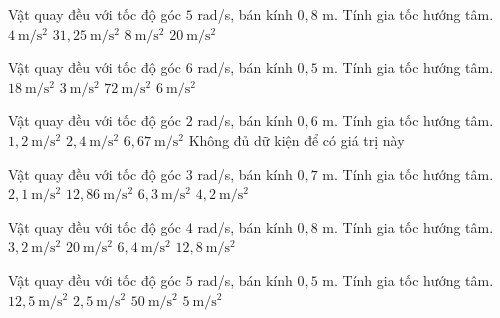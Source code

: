 \begin{ex}
Vật quay đều với tốc độ góc $5$ rad/s, bán kính $0,8$ m. Tính gia tốc hướng tâm.
\choice
{$4\ \mathrm{m/s^2}$}
{$31,25\ \mathrm{m/s^2}$}
{$8\ \mathrm{m/s^2}$}
{\True $20\ \mathrm{m/s^2}$}
\end{ex}

\begin{ex}
Vật quay đều với tốc độ góc $6$ rad/s, bán kính $0,5$ m. Tính gia tốc hướng tâm.
\choice
{\True $18\ \mathrm{m/s^2}$}
{$3\ \mathrm{m/s^2}$}
{$72\ \mathrm{m/s^2}$}
{$6\ \mathrm{m/s^2}$}
\end{ex}

\begin{ex}
Vật quay đều với tốc độ góc $2$ rad/s, bán kính $0,6$ m. Tính gia tốc hướng tâm.
\choice
{$1,2\ \mathrm{m/s^2}$}
{\True $2,4\ \mathrm{m/s^2}$}
{$6,67\ \mathrm{m/s^2}$}
{Không đủ dữ kiện để có giá trị này}
\end{ex}

\begin{ex}
Vật quay đều với tốc độ góc $3$ rad/s, bán kính $0,7$ m. Tính gia tốc hướng tâm.
\choice
{$2,1\ \mathrm{m/s^2}$}
{$12,86\ \mathrm{m/s^2}$}
{\True $6,3\ \mathrm{m/s^2}$}
{$4,2\ \mathrm{m/s^2}$}
\end{ex}

\begin{ex}
Vật quay đều với tốc độ góc $4$ rad/s, bán kính $0,8$ m. Tính gia tốc hướng tâm.
\choice
{$3,2\ \mathrm{m/s^2}$}
{$20\ \mathrm{m/s^2}$}
{$6,4\ \mathrm{m/s^2}$}
{\True $12,8\ \mathrm{m/s^2}$}
\end{ex}

\begin{ex}
Vật quay đều với tốc độ góc $5$ rad/s, bán kính $0,5$ m. Tính gia tốc hướng tâm.
\choice
{\True $12,5\ \mathrm{m/s^2}$}
{$2,5\ \mathrm{m/s^2}$}
{$50\ \mathrm{m/s^2}$}
{$5\ \mathrm{m/s^2}$}
\end{ex}

